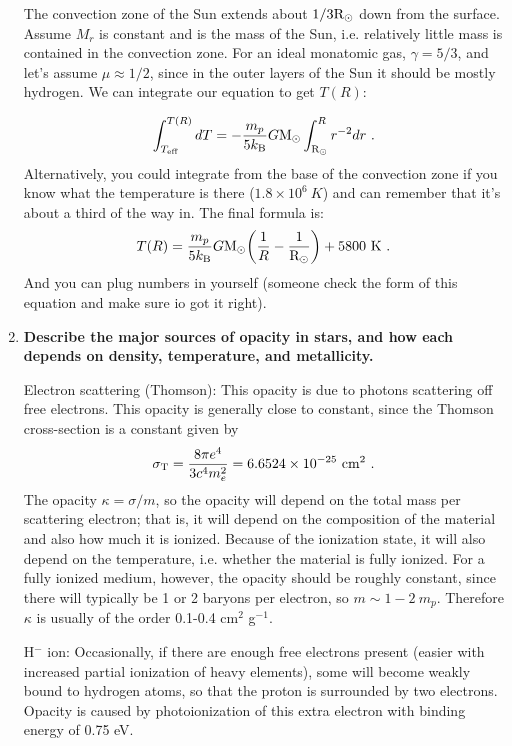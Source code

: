 \begin{enumerate}
	The convection zone of the Sun extends about $1/3 {\rm R}_\odot$ down from the surface. Assume $M_r$ is constant and is the mass of the Sun, i.e. relatively little mass is contained in the convection zone. For an ideal monatomic gas, $\gamma = 5/3$, and let's assume $\mu \approx 1/2$, since in the outer layers of the Sun it should be mostly hydrogen. We can integrate our equation to get $T(R)$:
	
	\begin{equation}
	\int^{T(R)}_{T_{\rm eff}} dT = -\frac{m_p}{5 k_{\rm B}} G {\rm M}_\odot \int^R_{\rm R_\odot} r^{-2}dr \,\, .
	\end{equation}
	Alternatively, you could integrate from the base of the convection zone if you know what the temperature is there ($1.8 \times 10^6~K$) and can remember that it's about a third of the way in. The final formula is:
	\begin{equation}
	T(R) = \frac{m_p}{5 k_{\rm B}} G {\rm M}_\odot \biggl( \frac{1}{R} - \frac{1}{{\rm R}_\odot}\biggr) + 5800~{\rm K}\,\, .
	\end{equation}
	And you can plug numbers in yourself (someone check the form of this equation and make sure io got it right).
	
\item \textbf{Describe the major sources of opacity in stars, and how each depends on density,
      temperature, and metallicity.}
      
      Electron scattering (Thomson): This opacity is due to photons scattering off free electrons. This opacity is generally close to constant, since the Thomson cross-section is a constant given by
      \begin{equation}
      \sigma_{\rm T} = \frac{8 \pi e^4}{3 c^4 m_e^2} = 6.6524\times 10^{-25}~{\rm cm}^2\,\, .
      \end{equation}
      The opacity $\kappa = \sigma / m$, so the opacity will depend on the total mass per scattering electron; that is, it will depend on the composition of the material and also how much it is ionized. Because of the ionization state, it will also depend on the temperature, i.e. whether the material is fully ionized. For a fully ionized medium, however, the opacity should be roughly constant, since there will typically be 1 or 2 baryons per electron, so $m \sim 1-2~m_p$. Therefore $\kappa$ is usually of the order 0.1-0.4 cm$^2$ g$^{-1}$.
      
      H$^-$ ion: Occasionally, if there are enough free electrons present (easier with increased partial ionization of heavy elements), some will become weakly bound to hydrogen atoms, so that the proton is surrounded by two electrons. Opacity is caused by photoionization of this extra electron with binding energy of 0.75 eV. 
      

\end{enumerate}
